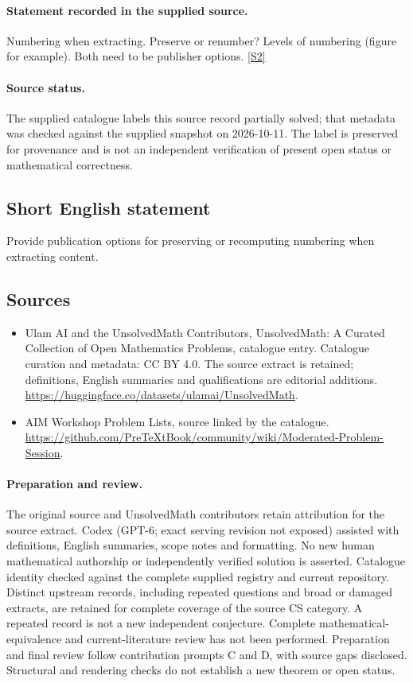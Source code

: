 \documentclass[11pt]{article}
\begin{document}
\paragraph{Statement recorded in the supplied source.}
Numbering when extracting. Preserve or renumber? Levels of numbering (figure for example). Both need to be publisher options. \href{https://github.com/PreTeXtBook/community/wiki/Moderated-Problem-Session}{[S2]}
\paragraph{Source status.}
The supplied catalogue labels this source record partially solved; that metadata was checked against the supplied snapshot on 2026-10-11. The label is preserved for provenance and is not an independent verification of present open status or mathematical correctness.
\subsection{Short English statement}
Provide publication options for preserving or recomputing numbering when extracting content.
\subsection{Sources}
\begin{itemize}
\item[S1] Ulam AI and the UnsolvedMath Contributors, UnsolvedMath: A Curated Collection of Open Mathematics Problems, catalogue entry. Catalogue curation and metadata: CC BY 4.0. The source extract is retained; definitions, English summaries and qualifications are editorial additions.
\url{https://huggingface.co/datasets/ulamai/UnsolvedMath}.
\item[S2] AIM Workshop Problem Lists, source linked by the catalogue.
\url{https://github.com/PreTeXtBook/community/wiki/Moderated-Problem-Session}.
\end{itemize}
\paragraph{Preparation and review.}
The original source and UnsolvedMath contributors retain attribution for the source extract. Codex (GPT-6; exact serving revision not exposed) assisted with definitions, English summaries, scope notes and formatting. No new human mathematical authorship or independently verified solution is asserted. Catalogue identity checked against the complete supplied registry and current repository. Distinct upstream records, including repeated questions and broad or damaged extracts, are retained for complete coverage of the source CS category. A repeated record is not a new independent conjecture. Complete mathematical-equivalence and current-literature review has not been performed. Preparation and final review follow contribution prompts C and D, with source gaps disclosed. Structural and rendering checks do not establish a new theorem or open status.
\label{end:statement}
\end{document}
